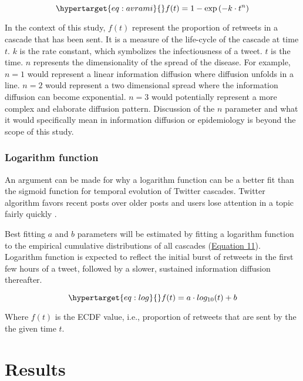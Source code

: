 \documentclass[11pt,a4paper]{article}
\begin{document}
        \begin{equation}
            \hypertarget{eq:avrami}{}
            f(t) = 1 - \exp\left(-k \cdot t^n\right)
        \end{equation}

        In the context of this study, $f(t)$ represent the proportion of retweets in a cascade that has been sent. It is a measure of the life-cycle of the cascade at time $t$. $k$ is the rate constant, which symbolizes the infectiousness of a tweet.  $t$ is the time. $n$ represents the dimensionality of the spread of the disease. For example, $n=1$ would represent a linear information diffusion where diffusion unfolds in a line. $n=2$ would represent a two dimensional spread where the information diffusion can become exponential. $n=3$ would potentially represent a more complex and elaborate diffusion pattern. Discussion of the $n$ parameter and what it would specifically mean in information diffusion or epidemiology is beyond the scope of this study.

        \subsubsection{Logarithm function}
        An argument can be made for why a logarithm function can be a better fit than the sigmoid function for temporal evolution of Twitter cascades. Twitter algorithm favors recent posts over older posts \cite{twitter_inc_twitters_2023} and users lose attention in a topic fairly quickly \cite{lorenz-spreen_accelerating_2019}.
        
        Best fitting $a$ and $b$ parameters will be estimated by fitting a logarithm function to the empirical cumulative distributions of all cascades (\hyperlink{eq:log}{Equation 11}). Logarithm function is expected to reflect the initial burst of retweets in the first few hours of a tweet, followed by a slower, sustained information diffusion thereafter.

        \begin{equation}
            \hypertarget{eq:log}{}
            f(t) = a \cdot log_{10}(t) + b
        \end{equation}

        Where $f(t)$ is the ECDF value, i.e., proportion of retweets that are sent by the the given time $t$.

\clearpage
\section{Results}
\end{document}

